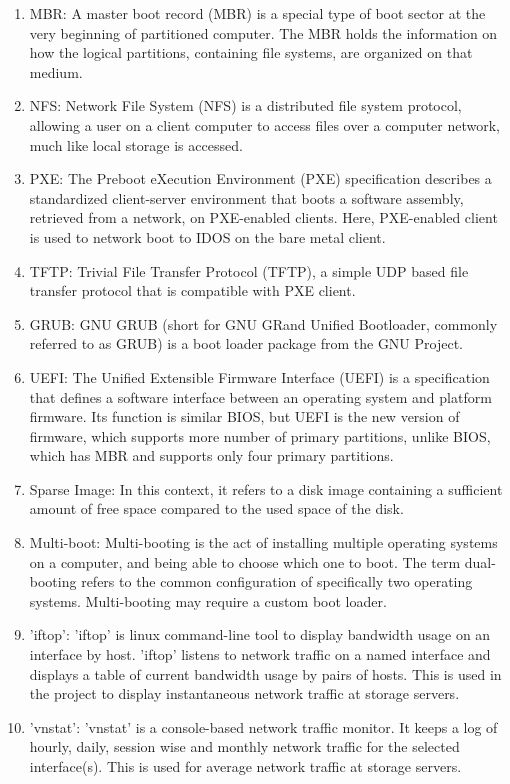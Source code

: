 \documentclass[a4paper,12pt]{article}
\begin{document}
\begin{enumerate}
     \item MBR: A master boot record (MBR) is a special type of boot sector at the very beginning of partitioned computer. The MBR holds the information on how the logical partitions, containing file systems, are organized on that medium.
    \item NFS: Network File System (NFS) is a distributed file system protocol, allowing a user on a client computer to access files over a computer network, much like local storage is accessed.
    \item PXE: The Preboot eXecution Environment (PXE) specification describes a standardized client-server environment that boots a software assembly, retrieved from a network, on PXE-enabled clients. Here, PXE-enabled client is used to network boot to IDOS on the bare metal client.
    \item TFTP: Trivial File Transfer Protocol (TFTP), a simple UDP based file transfer protocol that is compatible with PXE client.
    \item GRUB: GNU GRUB (short for GNU GRand Unified Bootloader, commonly referred to as GRUB) is a boot loader package from the GNU Project. 
    \item UEFI: The Unified Extensible Firmware Interface (UEFI) is a specification that defines a software interface between an operating system and platform firmware. Its function is similar BIOS, but UEFI is the new version of firmware, which supports more number of primary partitions, unlike  BIOS, which has MBR and supports only four primary partitions.
    \item Sparse Image: In this context, it refers to a disk image containing a sufficient amount of free space compared to the used space of the disk.
    \item Multi-boot: Multi-booting is the act of installing multiple operating systems on a computer, and being able to choose which one to boot. The term dual-booting refers to the common configuration of specifically two operating systems. Multi-booting may require a custom boot loader. 
    \item'iftop': 'iftop' is linux command-line tool to display bandwidth usage on an interface by host. 'iftop' listens to network traffic on a named interface and displays a table of current bandwidth usage by pairs of hosts. This is used in the project to display instantaneous network traffic at storage servers.
    \item 'vnstat':  'vnstat' is a console-based network traffic monitor. It keeps a log of hourly, daily, session wise and monthly network traffic for the selected interface(s). This is used for average network traffic at storage servers.
    
\end{enumerate}
\end{document}
